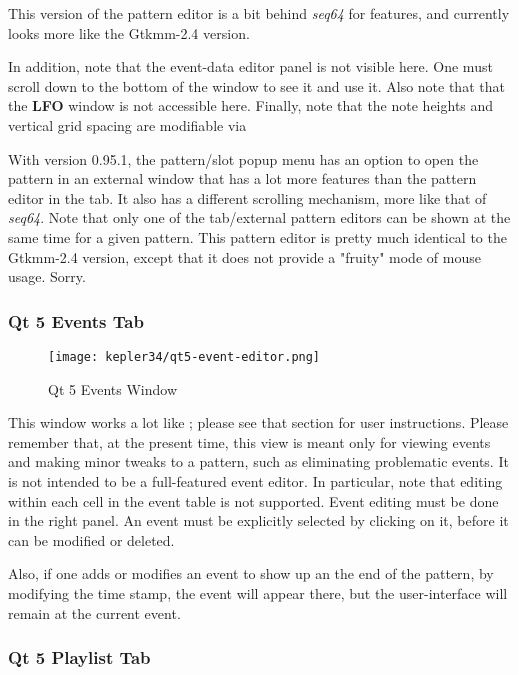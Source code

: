    This version of the pattern editor is a bit behind
   \textsl{seq64} for features, and currently looks more like the Gtkmm-2.4
   version.

   In addition, note that the event-data editor panel is not visible here.
   One must scroll down to the bottom of the window to see it and use it.
   Also note that that the \textbf{LFO} window is not accessible here.
   Finally, note that the note heights and vertical grid spacing are
   modifiable via

   With version 0.95.1, the pattern/slot popup menu has an option to open the
   pattern in an external window that has a lot more features than the
   pattern editor in the tab.  It also has a different scrolling mechanism,
   more like that of \textsl{seq64}.
   Note that only one of the tab/external pattern
   editors can be shown at the same time for a given pattern.
   This pattern editor is pretty much identical to the Gtkmm-2.4 version,
   except that it does not provide a "fruity" mode of mouse usage.
   Sorry.

\subsubsection{Qt 5 Events Tab}
\label{subsubsec:qt_portmidi_qt5_events_tab}

\begin{figure}[H]
   \centering 
   \texttt{[image: kepler34/qt5-event-editor.png]}
   \caption{Qt 5 Events Window}
   \label{fig:qt5_events_window}
\end{figure}

   This window works a lot like ; please see
   that section for user instructions.  Please remember that, at the present
   time, this view is meant only for viewing events and making minor tweaks to
   a pattern, such as eliminating problematic events.  It is not intended to be
   a full-featured event editor.  In particular, note that editing within each
   cell in the event table is not supported.  Event editing must be done in the
   right panel.  An event must be explicitly selected by clicking on it, before
   it can be modified or deleted.

   Also, if one adds or modifies an event to show up an the end of the pattern,
   by modifying the time stamp, the event will appear there, but the
   user-interface will remain at the current event.

\subsubsection{Qt 5 Playlist Tab}
\label{subsubsec:qt_portmidi_qt5_playlist_tab}

